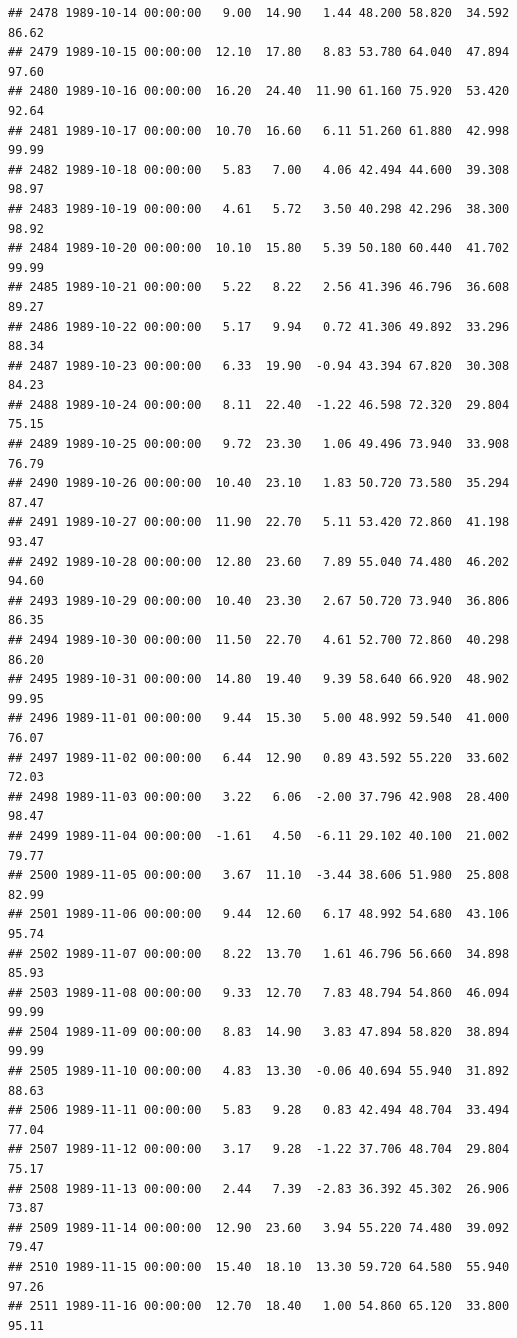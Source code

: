 \documentclass{article}\usepackage{graphicx, color}
\makeatletter
\newenvironment{kframe}{%
 \def\at@end@of@kframe{}%
 \ifinner\ifhmode%
  \def\at@end@of@kframe{\end{minipage}}%
  \begin{minipage}{\columnwidth}%
 \fi\fi%
 \def\FrameCommand##1{\hskip\@totalleftmargin \hskip-\fboxsep
 \colorbox{shadecolor}{##1}\hskip-\fboxsep
     \hskip-\linewidth \hskip-\@totalleftmargin \hskip\columnwidth}%
 \MakeFramed {\advance\hsize-\width
   \@totalleftmargin\z@ \linewidth\hsize
   \@setminipage}}%
 {\par\unskip\endMakeFramed%
 \at@end@of@kframe}
\newenvironment{knitrout}{}{} %
\makeatother
\begin{document}
\begin{knitrout}
\begin{kframe}
\begin{verbatim}
## 2478 1989-10-14 00:00:00   9.00  14.90   1.44 48.200 58.820  34.592  86.62
## 2479 1989-10-15 00:00:00  12.10  17.80   8.83 53.780 64.040  47.894  97.60
## 2480 1989-10-16 00:00:00  16.20  24.40  11.90 61.160 75.920  53.420  92.64
## 2481 1989-10-17 00:00:00  10.70  16.60   6.11 51.260 61.880  42.998  99.99
## 2482 1989-10-18 00:00:00   5.83   7.00   4.06 42.494 44.600  39.308  98.97
## 2483 1989-10-19 00:00:00   4.61   5.72   3.50 40.298 42.296  38.300  98.92
## 2484 1989-10-20 00:00:00  10.10  15.80   5.39 50.180 60.440  41.702  99.99
## 2485 1989-10-21 00:00:00   5.22   8.22   2.56 41.396 46.796  36.608  89.27
## 2486 1989-10-22 00:00:00   5.17   9.94   0.72 41.306 49.892  33.296  88.34
## 2487 1989-10-23 00:00:00   6.33  19.90  -0.94 43.394 67.820  30.308  84.23
## 2488 1989-10-24 00:00:00   8.11  22.40  -1.22 46.598 72.320  29.804  75.15
## 2489 1989-10-25 00:00:00   9.72  23.30   1.06 49.496 73.940  33.908  76.79
## 2490 1989-10-26 00:00:00  10.40  23.10   1.83 50.720 73.580  35.294  87.47
## 2491 1989-10-27 00:00:00  11.90  22.70   5.11 53.420 72.860  41.198  93.47
## 2492 1989-10-28 00:00:00  12.80  23.60   7.89 55.040 74.480  46.202  94.60
## 2493 1989-10-29 00:00:00  10.40  23.30   2.67 50.720 73.940  36.806  86.35
## 2494 1989-10-30 00:00:00  11.50  22.70   4.61 52.700 72.860  40.298  86.20
## 2495 1989-10-31 00:00:00  14.80  19.40   9.39 58.640 66.920  48.902  99.95
## 2496 1989-11-01 00:00:00   9.44  15.30   5.00 48.992 59.540  41.000  76.07
## 2497 1989-11-02 00:00:00   6.44  12.90   0.89 43.592 55.220  33.602  72.03
## 2498 1989-11-03 00:00:00   3.22   6.06  -2.00 37.796 42.908  28.400  98.47
## 2499 1989-11-04 00:00:00  -1.61   4.50  -6.11 29.102 40.100  21.002  79.77
## 2500 1989-11-05 00:00:00   3.67  11.10  -3.44 38.606 51.980  25.808  82.99
## 2501 1989-11-06 00:00:00   9.44  12.60   6.17 48.992 54.680  43.106  95.74
## 2502 1989-11-07 00:00:00   8.22  13.70   1.61 46.796 56.660  34.898  85.93
## 2503 1989-11-08 00:00:00   9.33  12.70   7.83 48.794 54.860  46.094  99.99
## 2504 1989-11-09 00:00:00   8.83  14.90   3.83 47.894 58.820  38.894  99.99
## 2505 1989-11-10 00:00:00   4.83  13.30  -0.06 40.694 55.940  31.892  88.63
## 2506 1989-11-11 00:00:00   5.83   9.28   0.83 42.494 48.704  33.494  77.04
## 2507 1989-11-12 00:00:00   3.17   9.28  -1.22 37.706 48.704  29.804  75.17
## 2508 1989-11-13 00:00:00   2.44   7.39  -2.83 36.392 45.302  26.906  73.87
## 2509 1989-11-14 00:00:00  12.90  23.60   3.94 55.220 74.480  39.092  79.47
## 2510 1989-11-15 00:00:00  15.40  18.10  13.30 59.720 64.580  55.940  97.26
## 2511 1989-11-16 00:00:00  12.70  18.40   1.00 54.860 65.120  33.800  95.11

\end{verbatim}
\end{kframe}
\end{knitrout}
\end{document}
